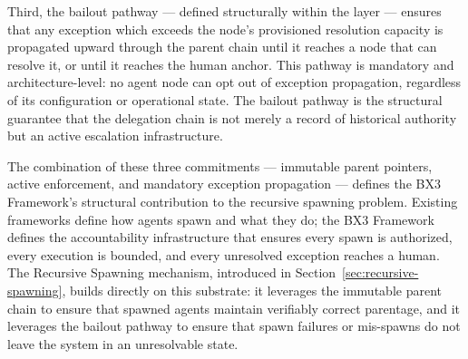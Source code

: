 Third, the bailout pathway — defined structurally within the \bounds{} layer — ensures that any exception which exceeds the node's provisioned resolution capacity is propagated upward through the parent chain until it reaches a node that can resolve it, or until it reaches the human anchor. This pathway is mandatory and architecture-level: no agent node can opt out of exception propagation, regardless of its configuration or operational state. The bailout pathway is the structural guarantee that the delegation chain is not merely a record of historical authority but an active escalation infrastructure.

The combination of these three commitments — immutable parent pointers, active \bounds{} enforcement, and mandatory exception propagation — defines the BX3 Framework's structural contribution to the recursive spawning problem. Existing frameworks define how agents spawn and what they do; the BX3 Framework defines the accountability infrastructure that ensures every spawn is authorized, every execution is bounded, and every unresolved exception reaches a human. The Recursive Spawning mechanism, introduced in Section~\ref{sec:recursive-spawning}, builds directly on this substrate: it leverages the immutable parent chain to ensure that spawned agents maintain verifiably correct parentage, and it leverages the bailout pathway to ensure that spawn failures or mis-spawns do not leave the system in an unresolvable state.